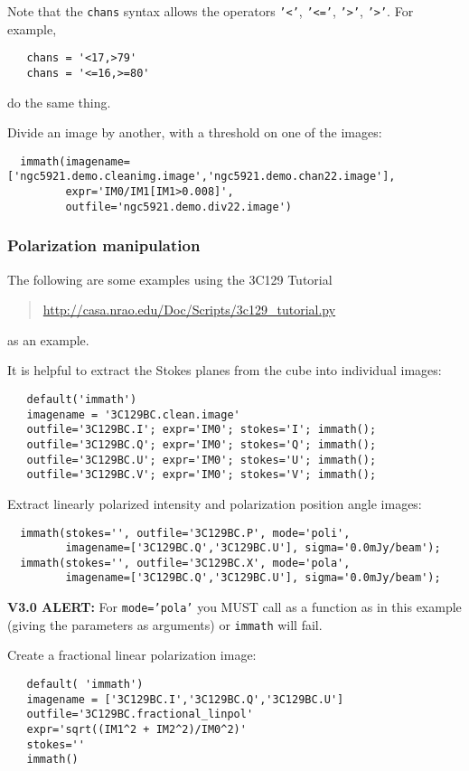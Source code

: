 Note that the {\tt chans} syntax allows the operators {\tt '<'},
{\tt '<='}, {\tt '>'}, {\tt '>'}.  For example,
\small
\begin{verbatim}
   chans = '<17,>79'
   chans = '<=16,>=80'
\end{verbatim}
\normalsize
do the same thing.

Divide an image by another, with a threshold on one of the images:
\small
\begin{verbatim}
  immath(imagename=['ngc5921.demo.cleanimg.image','ngc5921.demo.chan22.image'],
         expr='IM0/IM1[IM1>0.008]',
         outfile='ngc5921.demo.div22.image')
\end{verbatim}
\normalsize

\subsubsection{Polarization manipulation}
\label{section:analysis.immath.examples.pol}

The following are some examples using the 3C129 Tutorial
\begin{quote}
  \url{http://casa.nrao.edu/Doc/Scripts/3c129_tutorial.py}
\end{quote}
as an example.

It is helpful to extract the Stokes planes from the cube
into individual images:
\small
\begin{verbatim}
   default('immath')
   imagename = '3C129BC.clean.image'
   outfile='3C129BC.I'; expr='IM0'; stokes='I'; immath();
   outfile='3C129BC.Q'; expr='IM0'; stokes='Q'; immath();
   outfile='3C129BC.U'; expr='IM0'; stokes='U'; immath();
   outfile='3C129BC.V'; expr='IM0'; stokes='V'; immath();
\end{verbatim}
\normalsize

Extract linearly polarized intensity and polarization position angle images:
\small
\begin{verbatim}
  immath(stokes='', outfile='3C129BC.P', mode='poli', 
         imagename=['3C129BC.Q','3C129BC.U'], sigma='0.0mJy/beam'); 
  immath(stokes='', outfile='3C129BC.X', mode='pola', 
         imagename=['3C129BC.Q','3C129BC.U'], sigma='0.0mJy/beam'); 
\end{verbatim}
\normalsize
{\bf V3.0 ALERT:} For {\tt mode='pola'} you MUST call as a function as
in this example (giving the parameters as arguments) or {\tt immath}
will fail.

Create a fractional linear polarization image:
\small
\begin{verbatim}
   default( 'immath')
   imagename = ['3C129BC.I','3C129BC.Q','3C129BC.U']
   outfile='3C129BC.fractional_linpol'
   expr='sqrt((IM1^2 + IM2^2)/IM0^2)'
   stokes=''
   immath()
\end{verbatim}
\normalsize

